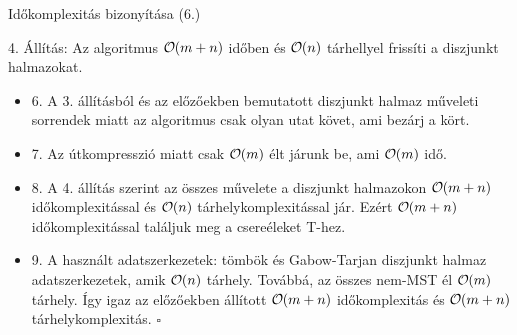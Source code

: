 \begin{frame}{Időkomplexitás bizonyítása (6.)}
  \begin{block}{4. Állítás:}
    Az algoritmus $ \bigO (m + n) $ időben és $ \bigO (n) $ tárhellyel frissíti a diszjunkt halmazokat.
  \end{block}
  \begin{itemize}
    \item 6. A 3. állításból és az előzőekben bemutatott diszjunkt halmaz műveleti sorrendek miatt az algoritmus csak olyan utat követ, ami bezárj a kört.
    \item 7. Az útkompresszió miatt csak $ \bigO (m) $ élt járunk be, ami $ \bigO (m) $ idő.
    \item 8. A 4. állítás szerint az összes művelete a diszjunkt halmazokon $ \bigO (m + n) $ időkomplexitással és $ \bigO (n) $ tárhelykomplexitással jár. Ezért $ \bigO (m + n) $ időkomplexitással találjuk meg a csereéleket T-hez.
    \item 9. A használt adatszerkezetek: tömbök és Gabow-Tarjan diszjunkt halmaz adatszerkezetek, amik $ \bigO (n) $ tárhely. Továbbá, az összes nem-MST él $ \bigO (m) $ tárhely. Így igaz az előzőekben állított $ \bigO (m + n) $ időkomplexitás és $ \bigO (m + n) $ tárhelykomplexitás. $ \square $
  \end{itemize}
\end{frame}